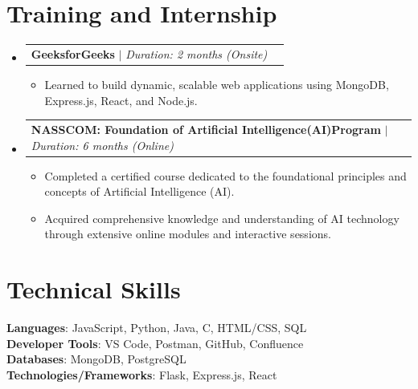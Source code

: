 \documentclass[letterpaper,11pt]{article}
\makeatletter
\newcommand{\resumeItem}[1]{
  \item\small{
    {#1 \vspace{-2pt}}
  }
}
\newcommand{\resumeProjectHeading}[2]{
    \item
    \begin{tabular*}{1.001\textwidth}{l@{\extracolsep{\fill}}r}
      \small#1 & \textbf{\small #2}\\
    \end{tabular*}\vspace{-7pt}
}
\newcommand{\resumeSubHeadingListStart}{\begin{itemize}[leftmargin=0.0in, label={}]}
\newcommand{\resumeSubHeadingListEnd}{\end{itemize}}
\newcommand{\resumeItemListStart}{\begin{itemize}}
\newcommand{\resumeItemListEnd}{\end{itemize}\vspace{-5pt}}
\makeatother
\begin{document}
\section{Training and Internship}
        \vspace{-5pt}
    \resumeSubHeadingListStart
      
      \resumeProjectHeading
          {\textbf{GeeksforGeeks} $|$ \emph{Duration: 2 months (Onsite)}}{}
          \resumeItemListStart
            \resumeItem{Learned to build dynamic, scalable web applications using MongoDB, Express.js, React, and Node.js.}
          \resumeItemListEnd
          \vspace{-13pt}


      \resumeProjectHeading
          {\textbf{NASSCOM: Foundation of Artificial Intelligence(AI)Program} $|$ \emph{Duration: 6 months (Online)}}{}
          \resumeItemListStart
            \resumeItem{Completed a certified course dedicated to the foundational principles and concepts of Artificial Intelligence (AI).}
            \resumeItem{Acquired comprehensive knowledge and understanding of AI technology through extensive online modules and interactive sessions.}
          \resumeItemListEnd 
        
 
     
    \resumeSubHeadingListEnd



%
\section{Technical Skills}
 \begin{itemize}[leftmargin=0.15in, label={}]
    \small{\item{
     \textbf{Languages}{: JavaScript, Python, Java, C, HTML/CSS, SQL} \\
     \textbf{Developer Tools}{: VS Code, Postman, GitHub, Confluence} \\
    \textbf{Databases}{: MongoDB, PostgreSQL } \\
     \textbf{Technologies/Frameworks}{: Flask, Express.js, React } \\
    }}
 \end{itemize}
 \vspace{-16pt}




\end{document}
